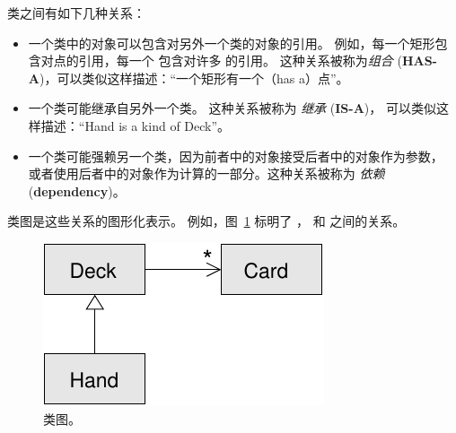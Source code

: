 
类之间有如下几种关系：

\begin{itemize}


\item 一个类中的对象可以包含对另外一个类的对象的引用。  
例如，每一个矩形包含对点的引用，每一个  包含对许多  的引用。 这种关系被称为{\em 组合} ({\bf HAS-A})，可以类似这样描述：``一个矩形有一个（has a）点''。


\item 一个类可能继承自另外一个类。  
这种关系被称为 {\em 继承} ({\bf IS-A})， 可以类似这样描述：``Hand is a kind of Deck''。


\item 一个类可能强赖另一个类，因为前者中的对象接受后者中的对象作为参数，
或者使用后者中的对象作为计算的一部分。这种关系被称为 {\em 依赖} ({\bf dependency})。

\end{itemize}



类图是这些关系的图形化表示。  例如，图~\ref{fig.class1} 标明了  ，  和
 之间的关系。

\begin{figure}
\centerline
{\includegraphics[scale=0.8]{../source/figs/class1.pdf}}
\caption{类图。}
\label{fig.class1}
\end{figure}

